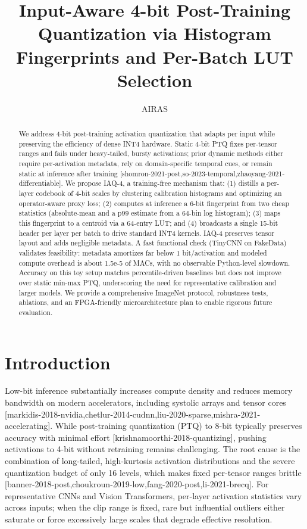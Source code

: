 \documentclass{article}
\title{Input-Aware 4-bit Post-Training Quantization via Histogram Fingerprints and Per-Batch LUT Selection}
\author{AIRAS}
\begin{document}
\maketitle

\begin{abstract}
We address 4-bit post-training activation quantization that adapts per input while preserving the efficiency of dense INT4 hardware. Static 4-bit PTQ fixes per-tensor ranges and fails under heavy-tailed, bursty activations; prior dynamic methods either require per-activation metadata, rely on domain-specific temporal cues, or remain static at inference after training [shomron-2021-post,so-2023-temporal,zhaoyang-2021-differentiable]. We propose IAQ-4, a training-free mechanism that: (1) distills a per-layer codebook of 4-bit scales by clustering calibration histograms and optimizing an operator-aware proxy loss; (2) computes at inference a 6-bit fingerprint from two cheap statistics (absolute-mean and a p99 estimate from a 64-bin log histogram); (3) maps this fingerprint to a centroid via a 64-entry LUT; and (4) broadcasts a single 15-bit header per layer per batch to drive standard INT4 kernels. IAQ-4 preserves tensor layout and adds negligible metadata. A fast functional check (TinyCNN on FakeData) validates feasibility: metadata amortizes far below 1 bit/activation and modeled compute overhead is about 1.5e-5 of MACs, with no observable Python-level slowdown. Accuracy on this toy setup matches percentile-driven baselines but does not improve over static min-max PTQ, underscoring the need for representative calibration and larger models. We provide a comprehensive ImageNet protocol, robustness tests, ablations, and an FPGA-friendly microarchitecture plan to enable rigorous future evaluation.
\end{abstract}

\section{Introduction}
Low-bit inference substantially increases compute density and reduces memory bandwidth on modern accelerators, including systolic arrays and tensor cores [markidis-2018-nvidia,chetlur-2014-cudnn,liu-2020-sparse,mishra-2021-accelerating]. While post-training quantization (PTQ) to 8-bit typically preserves accuracy with minimal effort [krishnamoorthi-2018-quantizing], pushing activations to 4-bit without retraining remains challenging. The root cause is the combination of long-tailed, high-kurtosis activation distributions and the severe quantization budget of only 16 levels, which makes fixed per-tensor ranges brittle [banner-2018-post,choukroun-2019-low,fang-2020-post,li-2021-brecq]. For representative CNNs and Vision Transformers, per-layer activation statistics vary across inputs; when the clip range is fixed, rare but influential outliers either saturate or force excessively large scales that degrade effective resolution.
\end{document}
